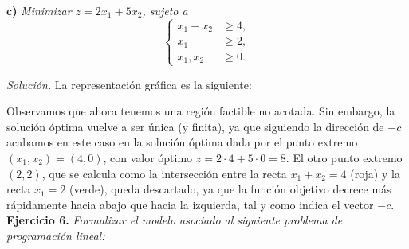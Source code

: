 \documentclass[11pt,a4paper]{article}
\begin{document}
\textbf{c)} \emph{Minimizar \( z = 2x_{1} + 5x_{2} \), sujeto a}
\[
\begin{cases}
  x_{1} + x_{2} &\geq 4,\\
  x_{1} &\geq 2,\\
  x_{1}, x_{2} &\geq 0.
\end{cases}
\]

\textit{Solución.} La representación gráfica es la siguiente:

\begin{figure}[!h]
\centering
{}
\end{figure}

Observamos que ahora tenemos una región factible no acotada. Sin embargo, la solución óptima vuelve a ser única (y finita), ya que siguiendo la dirección de $-c$ acabamos en este caso en la solución óptima dada por el punto extremo $(x_1, x_2)=(4, 0)$, con valor óptimo $z=2\cdot 4 + 5\cdot 0 = 8$. El otro punto extremo $(2, 2)$, que se calcula como la intersección entre la recta $x_1+x_2=4$ (roja) y la recta $x_1=2$ (verde), queda descartado, ya que la función objetivo decrece más rápidamente hacia abajo que hacia la izquierda, tal y como indica el vector $-c$.\\

\textbf{Ejercicio 6.} \emph{Formalizar el modelo asociado al siguiente problema de programación lineal:}
\end{document}

